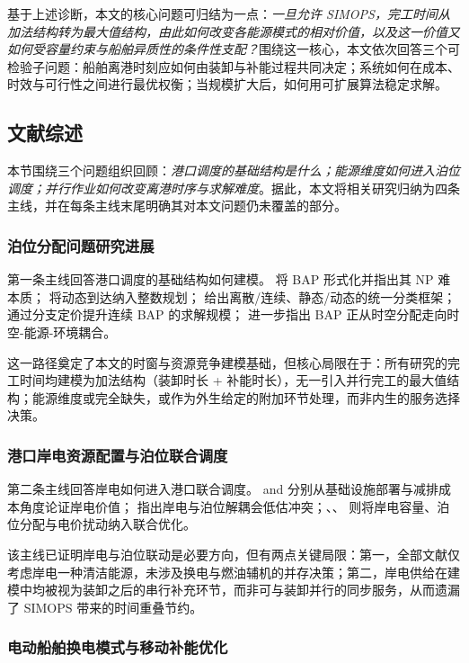 \documentclass[UTF8, a4paper, 12pt]{ctexart}
\theoremstyle{plain}
\theoremstyle{definition}
\theoremstyle{remark}
\begin{document}
基于上述诊断，本文的核心问题可归结为一点：\emph{一旦允许 SIMOPS，完工时间从加法结构转为最大值结构，由此如何改变各能源模式的相对价值，以及这一价值又如何受容量约束与船舶异质性的条件性支配？}围绕这一核心，本文依次回答三个可检验子问题：船舶离港时刻应如何由装卸与补能过程共同决定；系统如何在成本、时效与可行性之间进行最优权衡；当规模扩大后，如何用可扩展算法稳定求解。
\subsection{文献综述}
\label{sec:lit_review}
 
本节围绕三个问题组织回顾：\emph{港口调度的基础结构是什么；能源维度如何进入泊位调度；并行作业如何改变离港时序与求解难度}。据此，本文将相关研究归纳为四条主线，并在每条主线末尾明确其对本文问题仍未覆盖的部分。
 
\subsubsection{泊位分配问题研究进展}
 
第一条主线回答港口调度的基础结构如何建模。\citet{Lim1998} 将 BAP 形式化并指出其 NP 难本质；\citet{Imai2001} 将动态到达纳入整数规划；\citet{Bierwirth2010} 给出离散/连续、静态/动态的统一分类框架；\citet{Correcher2019} 通过分支定价提升连续 BAP 的求解规模；\citet{Rodrigues2022} 进一步指出 BAP 正从时空分配走向时空-能源-环境耦合。
 
这一路径奠定了本文的时窗与资源竞争建模基础，但核心局限在于：所有研究的完工时间均建模为加法结构（装卸时长 + 补能时长），无一引入并行完工的最大值结构；能源维度或完全缺失，或作为外生给定的附加环节处理，而非内生的服务选择决策。
 
\subsubsection{港口岸电资源配置与泊位联合调度}
 
第二条主线回答岸电如何进入港口联合调度。\citet{Winkel2016} and \citet{Zis2014} 分别从基础设施部署与减排成本角度论证岸电价值；\citet{Iris2019} 指出岸电与泊位解耦会低估冲突；\citet{Peng2021}、\citet{Yu2022_SP}、\citet{Zou2024} 则将岸电容量、泊位分配与电价扰动纳入联合优化。
 
该主线已证明岸电与泊位联动是必要方向，但有两点关键局限：第一，全部文献仅考虑岸电一种清洁能源，未涉及换电与燃油辅机的并存决策；第二，岸电供给在建模中均被视为装卸之后的串行补充环节，而非可与装卸并行的同步服务，从而遗漏了 SIMOPS 带来的时间重叠节约。
 
\subsubsection{电动船舶换电模式与移动补能优化}
 
\end{document}
